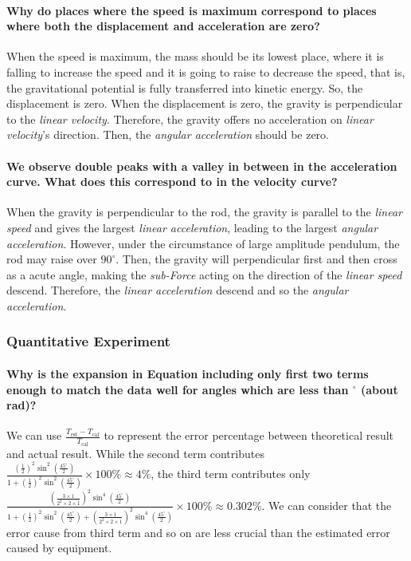 \paragraph{Why do places where the speed is maximum correspond to places where both the displacement and acceleration are zero?}
When the speed is maximum, the mass should be its lowest place, where it is falling to increase the speed and it is going to raise to decrease the speed, that is, the gravitational potential is fully transferred into kinetic energy. So, the displacement is zero. When the displacement is zero, the gravity is perpendicular to the \emph{linear velocity}. Therefore, the gravity offers no acceleration on \emph{linear velocity}'s direction. Then, the \emph{angular acceleration} should be zero.

\paragraph{We observe double peaks with a valley in between in the acceleration curve. What does this correspond to in the velocity curve? }
When the gravity is perpendicular to the rod, the gravity is parallel to the \emph{linear speed} and gives the largest \emph{linear acceleration}, leading to the largest \emph{angular acceleration}. However, under the circumstance of large amplitude pendulum, the rod may raise over $90^\circ$. Then, the gravity will perpendicular first and then cross as a acute angle, making the \emph{sub-Force} acting on the direction of the \emph{linear speed} descend. Therefore, the \emph{linear acceleration} descend and so the \emph{angular acceleration}.

\subsubsection{Quantitative Experiment}

\paragraph{Why is the expansion in Equation  including only first two terms enough to match the data well for angles which are less than $^\circ$ (about rad)?}
We can use $\frac{T_{\text{est}}-T_{\text{cal}}}{T_{\text{cal}}}$ to represent the error percentage between theoretical result and actual result. While the second term contributes $\frac{(\frac{1}{2})^2\sin^2(\frac{45^\circ}{2})}{1+(\frac{1}{2})^2\sin^2(\frac{45^\circ}{2})}\times100\%\approx4\%$, the third term contributes only $\frac{(\frac{3\times1}{2^2\times2\times1})^2\sin^4(\frac{45^\circ}{2})}{1+(\frac{1}{2})^2\sin^2(\frac{45^\circ}{2})+(\frac{3\times1}{2^2\times2\times1})^2\sin^4(\frac{45^\circ}{2})}\times100\%\approx0.302\%$. We can consider that the error cause from third term and so on are less crucial than the estimated error caused by equipment.


